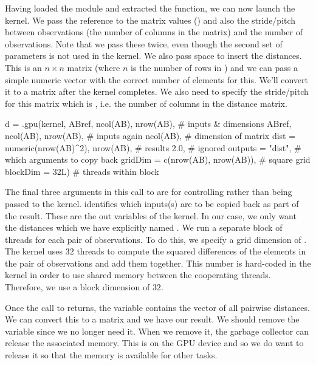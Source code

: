 Having loaded the module and extracted the function, 
we can now launch the kernel. We pass the reference
to the matrix values () and also
the stride/pitch between observations (the number of columns in 
the matrix) and the number of observations.
Note that we pass these twice, even though the second set of parameters is not
used in the kernel.
We also pass space to insert the distances. This is an $n \times n$
matrix  (where $n$ is the number of rows in )
and we can pass a simple numeric vector with the correct number of
elements for this.  We'll convert it to a matrix after the kernel
completes.
We also need to specify the stride/pitch for this matrix which is
, i.e. the number of columns in the distance matrix.
\begin{RCode}
d = .gpu(kernel,
         ABref, ncol(AB), nrow(AB),            # inputs & dimensions
         ABref, ncol(AB), nrow(AB),            # inputs again
         ncol(AB),                             # dimension of matrix
         dist = numeric(nrow(AB)^2), nrow(AB), # results
         2.0,                                  # ignored
         outputs = "dist",                # which arguments to copy back
         gridDim = c(nrow(AB), nrow(AB)), # square grid
         blockDim = 32L)                  # threads within block
\end{RCode}
The final three arguments in this call to  are for
controlling  rather than being passed to the kernel.
 identifies which inputs(s) are to be copied back as part
of the result. These are the out variables of the kernel.
In our case, we only want the distances which we have explicitly named
.
We run a separate block of threads for each pair of observations.
To do this, we specify a grid dimension of .
The kernel uses $32$ threads to compute the squared differences of the
elements in the pair of observations and add them together.
This number is hard-coded in the kernel in order to use shared memory
between the cooperating threads.
Therefore, we use a block dimension of $32$.

Once the call to  returns, the variable  contains
the vector of all pairwise distances.  We can convert this to a matrix
and we have our result.  We should remove the variable 
since we no longer need it. When we remove it, the garbage collector
can release the associated memory. This is on the GPU device and so we
do want to release it so that the memory is available for other tasks.


